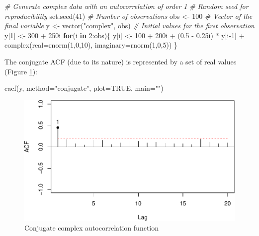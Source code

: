 \documentclass[
]{book}
\newenvironment{Shaded}{\begin{snugshade}}{\end{snugshade}}
\newcommand{\AttributeTok}[1]{\textcolor[rgb]{0.77,0.63,0.00}{#1}}
\newcommand{\CommentTok}[1]{\textcolor[rgb]{0.56,0.35,0.01}{\textit{#1}}}
\newcommand{\ConstantTok}[1]{\textcolor[rgb]{0.00,0.00,0.00}{#1}}
\newcommand{\ControlFlowTok}[1]{\textcolor[rgb]{0.13,0.29,0.53}{\textbf{#1}}}
\newcommand{\DecValTok}[1]{\textcolor[rgb]{0.00,0.00,0.81}{#1}}
\newcommand{\FloatTok}[1]{\textcolor[rgb]{0.00,0.00,0.81}{#1}}
\newcommand{\FunctionTok}[1]{\textcolor[rgb]{0.00,0.00,0.00}{#1}}
\newcommand{\NormalTok}[1]{#1}
\newcommand{\OtherTok}[1]{\textcolor[rgb]{0.56,0.35,0.01}{#1}}
\newcommand{\SpecialCharTok}[1]{\textcolor[rgb]{0.00,0.00,0.00}{#1}}
\newcommand{\StringTok}[1]{\textcolor[rgb]{0.31,0.60,0.02}{#1}}
\begin{document}
\begin{Shaded}
\begin{Highlighting}[]
\CommentTok{\# Generate complex data with an autocorrelation of order 1}
\CommentTok{\# Random seed for reproducibility}
\FunctionTok{set.seed}\NormalTok{(}\DecValTok{41}\NormalTok{)}
\CommentTok{\# Number of observations}
\NormalTok{obs }\OtherTok{\textless{}{-}} \DecValTok{100}
\CommentTok{\# Vector of the final variable}
\NormalTok{y }\OtherTok{\textless{}{-}} \FunctionTok{vector}\NormalTok{(}\StringTok{"complex"}\NormalTok{, obs)}
\CommentTok{\# Initial values for the first observation}
\NormalTok{y[}\DecValTok{1}\NormalTok{] }\OtherTok{\textless{}{-}} \DecValTok{300} \SpecialCharTok{+}\NormalTok{ 250i}
\ControlFlowTok{for}\NormalTok{(i }\ControlFlowTok{in} \DecValTok{2}\SpecialCharTok{:}\NormalTok{obs)\{}
\NormalTok{    y[i] }\OtherTok{\textless{}{-}} \DecValTok{100} \SpecialCharTok{+}\NormalTok{ 200i }\SpecialCharTok{+}\NormalTok{ (}\FloatTok{0.5} \SpecialCharTok{{-}} \FloatTok{0.25}\NormalTok{i) }\SpecialCharTok{*}\NormalTok{ y[i}\DecValTok{{-}1}\NormalTok{] }\SpecialCharTok{+}
        \FunctionTok{complex}\NormalTok{(}\AttributeTok{real=}\FunctionTok{rnorm}\NormalTok{(}\DecValTok{1}\NormalTok{,}\DecValTok{0}\NormalTok{,}\DecValTok{10}\NormalTok{), }\AttributeTok{imaginary=}\FunctionTok{rnorm}\NormalTok{(}\DecValTok{1}\NormalTok{,}\DecValTok{0}\NormalTok{,}\DecValTok{5}\NormalTok{))}
\NormalTok{\}}
\end{Highlighting}
\end{Shaded}

The conjugate ACF (due to its nature) is represented by a set of real values (Figure \ref{fig:complexAR1ACFConj}):

\begin{Shaded}
\begin{Highlighting}[]
\FunctionTok{cacf}\NormalTok{(y, }\AttributeTok{method=}\StringTok{"conjugate"}\NormalTok{, }\AttributeTok{plot=}\ConstantTok{TRUE}\NormalTok{, }\AttributeTok{main=}\StringTok{""}\NormalTok{)}
\end{Highlighting}
\end{Shaded}

\begin{figure}
\centering
\includegraphics{Svetunkov---Svetunkov---Complex-Valued-Econometrics_files/figure-latex/complexAR1ACFConj-1.pdf}
\caption{\label{fig:complexAR1ACFConj}Conjugate complex autocorrelation function}
\end{figure}
\end{document}
